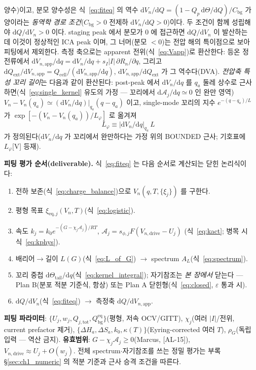 \documentclass[11pt,a4paper]{article}
\newcommand{\dd}{\mathrm{d}}
\newcommand{\eq}{\mathrm{eq}}
\newcommand{\app}{\mathrm{app}}
\newcommand{\drive}{\mathrm{drive}}
\newcommand{\bg}{\mathrm{bg}}
\newcommand{\cell}{\mathrm{cell}}
\newcommand{\ext}{\mathrm{ext}}
\newcommand{\tot}{\mathrm{tot}}
\newcommand{\AL}[1]{\textsf{[AL-#1]}}
\begin{document}
양수)이고, 분모 양수성은 식~\eqref{eq:fiteq} 의 역수 $\dd V_n/\dd Q=(1-Q_p\,\dd\Theta/\dd Q)/C_\bg$ 가
양이라는 \emph{동역학 경로 조건}($C_\bg>0$ 전제하 $\dd V_n/\dd Q>0$)이다. 두 조건이 함께 성립해야
$\dd Q/\dd V_n>0$ 이다. staging peak 에서 분모가
$0$ 에 접근하면 $\dd Q/\dd V_n$ 이 발산하는데 이것이 정상적인 ICA peak 이며, 그 너머(분모 $<0$)는 전압 해의
특이점으로 보아 피팅에서 제외한다. 측정 축으로는
apparent 전위(식~\eqref{eq:Vapp})로 환산한다: 등온 정전류에서 $\dd V_{n,\app}/\dd q=\dd V_n/\dd q+
s_I|I|\,\partial R_n/\partial q$, 그리고 $\dd Q_\ext/\dd V_{n,\app}=Q_\cell/(\dd V_{n,\app}/\dd q)$,
$\dd V_{n,\app}/\dd Q_\ext$ 가 그 역수다(DVA). \emph{전압축 특성 꼬리 길이}는 다음과 같이 환산된다: post-peak 에서
$\dd V_n/\dd q$ 를 $q_a$ 둘레 상수로 근사하면(식~\eqref{eq:single_kernel} 유도의 가정 — 꼬리에서
$\dd\mathcal A_j/\dd q\simeq0$ 인 완만 영역) $V_n-V_n(q_a)\simeq(\dd V_n/\dd q)|_{q_a}(q-q_a)$ 이고,
single-mode 꼬리의 지수 $e^{-(q-q_a)/L}$ 가 $\exp[-(V_n-V_n(q_a))/L_\varphi]$ 로 옮겨져
\begin{equation}
L_\varphi\equiv\big|\dd V_n/\dd q\big|_{q_a}\,L
\label{eq:Lphi}
\end{equation}
가 정의된다($\dd V_n/\dd q$ 가 꼬리에서 완만하다는 가정 위의 BOUNDED 근사; 기호표에 $L_\varphi$[V] 등재).

\textbf{피팅 평가 순서(deliverable).} 식~\eqref{eq:fiteq} 는 다음 순서로 계산되는 닫힌 논리식이다:
\begin{enumerate}[label=\textbf{S\arabic*.},leftmargin=2.4em]
\item 전하 보존(식~\eqref{eq:charge_balance})으로 $V_n(q,T,\{\xi_j\})$ 를 구한다.
\item 평형 목표 $\xi_{\eq,j}(V_n,T)$(식~\eqref{eq:logistic}).
\item 속도 $k_j=k_0 e^{-(G-\chi_j\mathcal A_j)/RT}$, $\mathcal A_j=s_{\phi,j}F(V_{n,\drive}-U_j)$
  (식~\eqref{eq:kact}; 병목 시 식~\eqref{eq:kphys}).
\item 배리어$\to$길이 $L(G)$(식~\eqref{eq:L_of_G}) $\to$ spectrum $A_L$(식~\eqref{eq:spectrum}).
\item 꼬리 중첩 $\dd\Theta_\mathrm{tail}/\dd q$(식~\eqref{eq:kernel_integral}); 자기참조는 \emph{본 장에서} 닫는다 —
  Plan B(분포 적분 기준식, 항상) 또는 Plan A 닫힌형(식~\eqref{eq:closed}, $\varepsilon$ 통과 시).
\item $\dd Q/\dd V_n$(식~\eqref{eq:fiteq}) $\to$ 측정축 $\dd Q/\dd V_{n,\app}$.
\end{enumerate}
\textbf{피팅 파라미터}: $\{U_j,w_j,Q_{j,\tot},Q_\bg^{\eq}\}$(평형, 저속 OCV/GITT), $\chi_j$(여러 $|I|$/전위, current prefactor 제거),
$\{\Delta H_a,\Delta S_a,k_0,\kappa(T)\}$(Eyring-corrected 여러 $T$), $\rho_G$(독립 입력 — 역산 금지). \textbf{유효범위}:
$G-\chi_j\mathcal A_j\ge0$(Marcus, \AL{15}), $V_{n,\drive}\approx U_j+O(w_j)$. 전체 spectrum$\cdot$자기참조를
쓰는 정밀 평가는 부록 \S\ref{sec:ch1_numeric} 의 적분 기준과 근사 승격 조건을 따른다.
\end{document}
